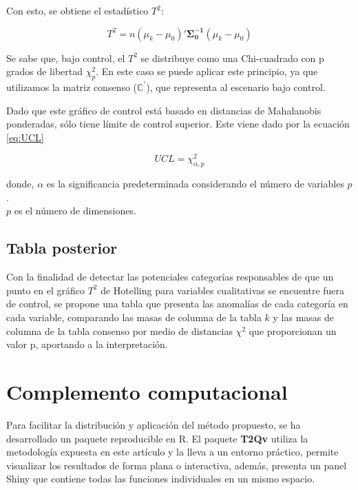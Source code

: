 \documentclass[water,article,submit,moreauthors,pdftex]{mdpi}
\begin{document}
Con esto, se obtiene el estadístico \(T^2\):

\begin{equation}
T^2=n (\mu_{k}-\mu_{0})'\mathbf{\Sigma_{0}^{-1}}(\mu_{k}-\mu_{0})
\label{eq:T2}
\end{equation}

Se sabe que, bajo control, el \(T^2\) se distribuye como una
Chi-cuadrado con p grados de libertad \(\chi^2_p\). En este caso se
puede aplicar este principio, ya que utilizamos la matriz consenso
(\(\mathbb{C}^{'}\)), que representa al escenario bajo control.

Dado que este gráfico de control está basado en distancias de
Mahalanobis ponderadas, sólo tiene límite de control superior. Este
viene dado por la ecuación \ref{eq:UCL}

\begin{equation}
UCL=\chi^2_{\alpha,p}
\label{eq:UCL}
\end{equation}

donde, \(\alpha\) es la significancia predeterminada considerando el
número de variables \(p\).\\
\(p\) es el número de dimensiones.

\hypertarget{tabla-posterior}{%
\subsection{Tabla posterior}\label{tabla-posterior}}

Con la finalidad de detectar las potenciales categorías responsables de
que un punto en el gráfico \(T^2\) de Hotelling para variables
cualitativas se encuentre fuera de control, se propone una tabla que
presenta las anomalías de cada categoría en cada variable, comparando
las masas de columna de la tabla \(k\) y las masas de columna de la
tabla consenso por medio de distancias \(\chi^2\) que proporcionan un
valor p, aportando a la interpretación.

\hypertarget{complemento-computacional}{%
\section{Complemento computacional}\label{complemento-computacional}}

Para facilitar la distribución y aplicación del método propuesto, se ha
desarrollado un paquete reproducible en R. El paquete \textbf{T2Qv}
utiliza la metodología expuesta en este artículo y la lleva a un entorno
práctico, permite visualizar los resultados de forma plana o
interactiva, además, presenta un panel Shiny que contiene todas las
funciones individuales en un mismo espacio.
\end{document}
